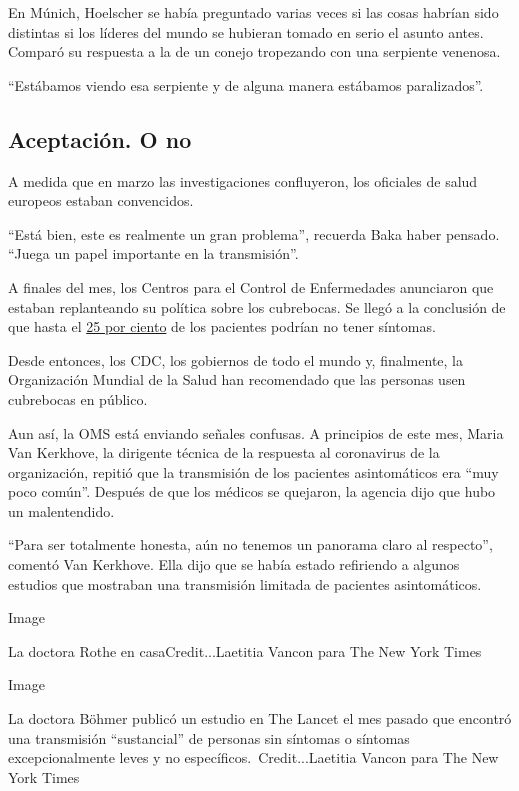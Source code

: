 En Múnich, Hoelscher se había preguntado varias veces si las cosas
habrían sido distintas si los líderes del mundo se hubieran tomado en
serio el asunto antes. Comparó su respuesta a la de un conejo tropezando
con una serpiente venenosa.

``Estábamos viendo esa serpiente y de alguna manera estábamos
paralizados''.

\hypertarget{aceptaciuxf3n-o-no}{%
\subsection{Aceptación. O no}\label{aceptaciuxf3n-o-no}}

A medida que en marzo las investigaciones confluyeron, los oficiales de
salud europeos estaban convencidos.

``Está bien, este es realmente un gran problema'', recuerda Baka haber
pensado. ``Juega un papel importante en la transmisión''.

A finales del mes, los Centros para el Control de Enfermedades
anunciaron que estaban replanteando su política sobre los cubrebocas. Se
llegó a la conclusión de que hasta el
\href{https://www.nytimes3xbfgragh.onion/2020/03/31/health/coronavirus-asymptomatic-transmission.html}{25
por ciento} de los pacientes podrían no tener síntomas.

Desde entonces, los CDC, los gobiernos de todo el mundo y, finalmente,
la Organización Mundial de la Salud han recomendado que las personas
usen cubrebocas en público.

Aun así, la OMS está enviando señales confusas. A principios de este
mes, Maria Van Kerkhove, la dirigente técnica de la respuesta al
coronavirus de la organización, repitió que la transmisión de los
pacientes asintomáticos era ``muy poco común''. Después de que los
médicos se quejaron, la agencia dijo que hubo un malentendido.

``Para ser totalmente honesta, aún no tenemos un panorama claro al
respecto'', comentó Van Kerkhove. Ella dijo que se había estado
refiriendo a algunos estudios que mostraban una transmisión limitada de
pacientes asintomáticos.

Image

La doctora Rothe en casaCredit...Laetitia Vancon para The New York Times

Image

La doctora Böhmer publicó un estudio en The Lancet el mes pasado que
encontró una transmisión ``sustancial'' de personas sin síntomas o
síntomas excepcionalmente leves y no específicos.~Credit...Laetitia
Vancon para The New York Times

